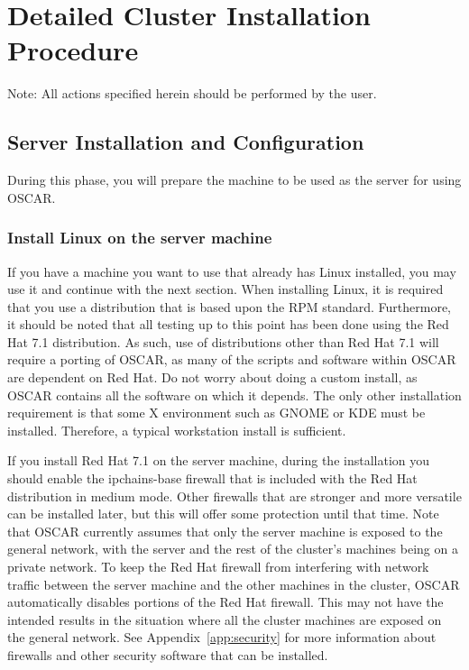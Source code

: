 %
%
%

\section{Detailed Cluster Installation Procedure}

Note: All actions specified herein should be performed by the
 user.


\subsection{Server Installation and Configuration}
  
During this phase, you will prepare the machine to be used as the
server for using OSCAR.

\subsubsection{Install Linux on the server machine} 

If you have a machine you want to use that already has Linux
installed, you may use it and continue with the next section. When installing
Linux, it is required that you use a distribution that is based upon
the RPM standard.  Furthermore, it should be noted that all testing up
to this point has been done using the Red Hat 7.1 distribution. As
such, use of distributions other than Red Hat 7.1 will require a
porting of OSCAR, as many of the scripts and software within OSCAR are
dependent on Red Hat. Do not worry about doing a custom install, as
OSCAR contains all the software on which it depends.  The only other
installation requirement is that some X environment such as GNOME or
KDE must be installed. Therefore, a typical workstation install is
sufficient.

\begchange
If you install Red Hat 7.1 on the server machine, during the
installation you should enable the ipchains-base firewall that is 
included with the Red Hat distribution in medium mode.
Other firewalls that are stronger and more versatile can be installed
later, but this will offer some protection until that time.
Note that OSCAR currently assumes that only the server machine is
exposed to the general network, with the server and the rest of the
cluster's machines being on a private network. To keep the Red Hat
firewall from interfering with network traffic between the server
machine and the other machines in the cluster, OSCAR automatically
disables portions of the Red Hat firewall. This may not have the
intended results in the situation where all the cluster machines
are exposed on the general network.
See Appendix~\ref{app:security} for more information about firewalls
and other security software that can be installed. 
\endchange

